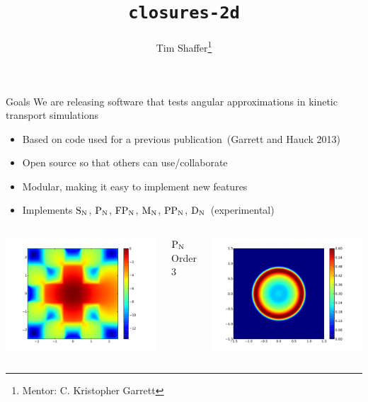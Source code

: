\documentclass{beamer}
\title{\texttt{closures-2d}}
\author{Tim Shaffer\thanks{Mentor: C. Kristopher Garrett}}
\newcommand{\SN}{\ensuremath{\textnormal{S}_\textnormal{N}}\xspace}
\newcommand{\PN}{\ensuremath{\textnormal{P}_\textnormal{N}}\xspace}
\newcommand{\MN}{\ensuremath{\textnormal{M}_\textnormal{N}}\xspace}
\newcommand{\PPN}{\ensuremath{\textnormal{PP}_\textnormal{N}}\xspace}
\newcommand{\FPN}{\ensuremath{\textnormal{FP}_\textnormal{N}}\xspace}
\newcommand{\DN}{\ensuremath{\textnormal{D}_\textnormal{N}}\xspace}
\begin{document}
    \frame{\titlepage}

    \begin{frame}{Goals}
        We are releasing software that tests angular approximations in kinetic transport simulations
        \begin{itemize}
            \item Based on code used for a previous publication~(Garrett and Hauck 2013)
            \item Open source so that others can use/collaborate
            \item Modular, making it easy to implement new features
            \item Implements \SN, \PN, \FPN, \MN, \PPN, \DN~(experimental)
        \end{itemize}

        \vfill

        \begin{columns}
            \centering
            \includegraphics[width=\textwidth]{lattice.pdf}

            \PN Order 3

            \centering
            \includegraphics[width=\textwidth]{FP03-sspline-400-tune=20.pdf}


\end{columns}
\end{frame}
\end{document}
